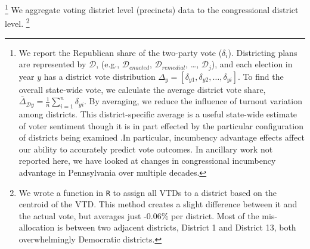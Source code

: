         \footnote{We report the Republican share of the two-party vote ($\delta_{i}$). Districting plans are represented by $\mathcal D $, (e.g., $\mathcal D_{enacted}$, $\mathcal D_{remedial}$, \dots, $\mathcal D_{j}$), and each election in year $ y $ has a district vote distribution $ \Delta_{y} = [\delta_{y1}, \delta_{y2}, \dots, \delta_{yi}] $. To find the overall state-wide vote, we calculate the average district vote share, $ \bar{\Delta}_{\mathcal D y} = \frac{1}{n}\sum\limits_{i=1}^{n} \delta_{yi} $. By averaging, we reduce the influence of turnout variation among districts. This district-specific average is a useful state-wide estimate of voter sentiment though it is in part effected by the particular configuration of districts being examined \citep[see e.g.][cf. \cite{Grofman_et_al_1997__IntedgratedPerspective_ES}]{Kastellec_et_al_2008_PS}.In particular, incumbency advantage effects affect our ability to accurately predict vote outcomes. In ancillary work not reported here, we have looked at changes in congressional incumbency advantage in Pennsylvania over multiple decades.}
    We aggregate voting district level (precincts) data to the congressional district level.
		\footnote{We wrote a function in \texttt{R} to assign all VTDs to a district based on the centroid of the VTD. This method creates a slight difference between it and the actual vote, but averages just -0.06\% per district. Most of the mis-allocation is between two adjacent districts, District 1 and District 13, both overwhelmingly Democratic districts.}


